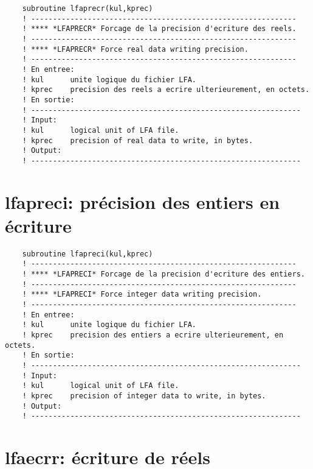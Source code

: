 \documentclass[10pt,french]{book}
\begin{document}
 
\begin{verbatim}
	subroutine lfaprecr(kul,kprec)
	! -------------------------------------------------------------                
	! **** *LFAPRECR* Forcage de la precision d'ecriture des reels.
	! -------------------------------------------------------------                
	! **** *LFAPRECR* Force real data writing precision.
	! -------------------------------------------------------------                
	! En entree:
	! kul      unite logique du fichier LFA.
	! kprec    precision des reels a ecrire ulterieurement, en octets.
	! En sortie:
	! --------------------------------------------------------------
	! Input:
	! kul      logical unit of LFA file.
	! kprec    precision of real data to write, in bytes.
	! Output:
	! --------------------------------------------------------------
\end{verbatim}
 
\section{lfapreci: précision des entiers en écriture}
\begin{verbatim}
	subroutine lfapreci(kul,kprec)
	! -------------------------------------------------------------                
	! **** *LFAPRECI* Forcage de la precision d'ecriture des entiers.
	! -------------------------------------------------------------                
	! **** *LFAPRECI* Force integer data writing precision.
	! -------------------------------------------------------------                
	! En entree:
	! kul      unite logique du fichier LFA.
	! kprec    precision des entiers a ecrire ulterieurement, en octets.
	! En sortie:
	! --------------------------------------------------------------
	! Input:
	! kul      logical unit of LFA file.
	! kprec    precision of integer data to write, in bytes.
	! Output:
	! --------------------------------------------------------------
\end{verbatim}

\section{lfaecrr: écriture de réels}
 
 
 
\end{document}

